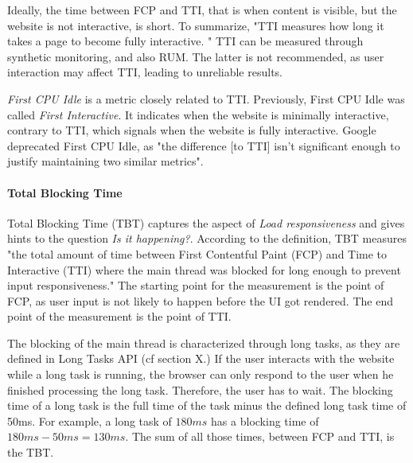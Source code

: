 Ideally, the time between FCP and TTI, that is when content is visible, but the website is not interactive, is short.
To summarize, "TTI measures how long it takes a page to become fully interactive. " %
TTI can be measured through synthetic monitoring, and also RUM.
The latter is not recommended, as user interaction may affect TTI, leading to unreliable results.



\textit{First CPU Idle} is a metric closely related to TTI.
Previously, First CPU Idle was called \textit{First Interactive}. %
It indicates when the website is minimally interactive, contrary to TTI, which signals when the website is fully interactive.
Google deprecated First CPU Idle, as "the difference [to TTI] isn't significant enough to justify maintaining two similar metrics". %





\paragraph{Total Blocking Time}


Total Blocking Time (TBT) captures the aspect of \textit{Load responsiveness} and gives hints to the question \textit{Is it happening?}.
According to the definition, TBT measures "the total amount of time between First Contentful Paint (FCP) and Time to Interactive (TTI) where the main thread was blocked for long enough to prevent input responsiveness." %
The starting point for the measurement is the point of FCP, as user input is not likely to happen before the UI got rendered.
The end point of the measurement is the point of TTI.

The blocking of the main thread is characterized through long tasks, as they are defined in Long Tasks API (cf section X.)
If the user interacts with the website while a long task is running, the browser can only respond to the user when he finished processing the long task.
Therefore, the user has to wait.
The blocking time of a long task is the full time of the task minus the defined long task time of 50ms.
For example, a long task of $180ms$ has a blocking time of $180ms - 50ms = 130ms$.
The sum of all those times, between FCP and TTI, is the TBT.



